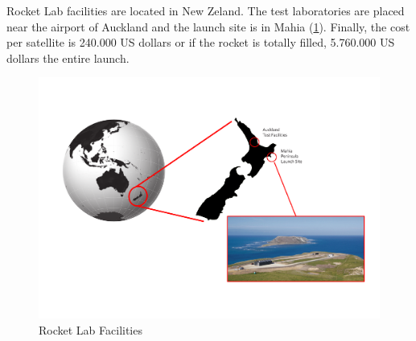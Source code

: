 Rocket Lab facilities are located in New Zeland. The test laboratories are placed near the airport of Auckland and the launch site is in Mahia (\ref{facilities}).
\newline
Finally, the cost per satellite is 240.000 US dollars or if the rocket is totally filled, 5.760.000 US dollars the entire launch. 
\begin{figure}[h!]
\includegraphics[scale=0.5]{./sections/Constellation_Deployment/S2-Launcher/Images_S2/Picture_4_S2.pdf} 
\caption{Rocket Lab Facilities}
\label{facilities}
\end{figure}
\newline


















%